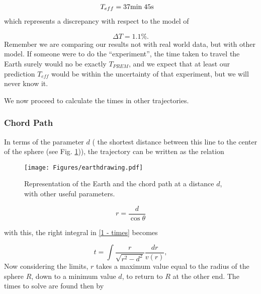 \documentclass[aps,twocolumn,showpacs,preprintnumbers]{revtex4}
\begin{document}
        \begin{align*}
            T_{eff} &= 37 \text{min}  \hspace{0.1cm} 45 \text{s}
        \end{align*}
        which represents a discrepancy with respect to the model of
        
        \begin{equation*}
            \Delta T = 1.1 \% .
        \end{equation*}
        Remember we are comparing our results not with real world data, but with other model. If someone were to do the ``experiment'', the time taken to travel the Earth surely would no be exactly $T_{PREM}$, and we expect that at least our prediction $T_{eff}$ would be within the uncertainty of that experiment, but we will never know it.
        
        We now proceed to calculate the times in other trajectories.
                
        \subsubsection{Chord Path}
    
        In terms of the parameter $ d $ ( the shortest distance between this line to the center of the sphere (see Fig. \ref{fig: 1- Earth drawing})), the trajectory can be written as the relation
            
        \begin{figure}
            \centering
            \texttt{[image: Figures/earthdrawing.pdf]}
            \caption{Representation of the Earth and the chord path at a distance $d$, with other useful parameters.}
            \label{fig: 1- Earth drawing}
        \end{figure}    
            
        \begin{equation*}
            r = \frac{d}{\cos{\theta}}
        \end{equation*}
                
        with this, the right integral in \eqref{1 - times} becomes
            
        \begin{equation*}
            t = \int \frac{r}{\sqrt{r^2 -d^2}} \frac{dr}{v(r)},
        \end{equation*}
        Now considering the limits, $ r $ takes a maximum value equal to the radius of the sphere $ R $, down to a minimum value $ d $, to return to $ R $ at the other end. The times to solve are found then by
        
\end{document}
